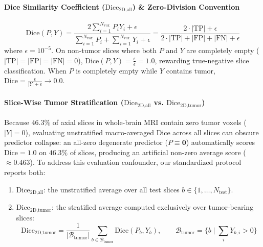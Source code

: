 \documentclass{article}
\begin{document}
\paragraph{Dice Similarity Coefficient ($\text{Dice}_{\text{2D,all}}$) \& Zero-Division Convention}
\begin{equation}
    \text{Dice}(P, Y) = \frac{2 \sum_{i=1}^{N_{\text{vox}}} P_i Y_i + \epsilon}{\sum_{i=1}^{N_{\text{vox}}} P_i + \sum_{i=1}^{N_{\text{vox}}} Y_i + \epsilon} = \frac{2 \cdot |\text{TP}| + \epsilon}{2 \cdot |\text{TP}| + |\text{FP}| + |\text{FN}| + \epsilon}
\end{equation}
where $\epsilon = 10^{-5}$. On non-tumor slices where both $P$ and $Y$ are completely empty ($|\text{TP}| = |\text{FP}| = |\text{FN}| = 0$), $\text{Dice}(P, Y) = \frac{\epsilon}{\epsilon} = 1.0$, rewarding true-negative slice classification. When $P$ is completely empty while $Y$ contains tumor, $\text{Dice} = \frac{\epsilon}{|Y| + \epsilon} \to 0.0$.

\paragraph{Slice-Wise Tumor Stratification ($\text{Dice}_{\text{2D,all}}$ vs. $\text{Dice}_{\text{2D,tumor}}$)}
Because $46.3\%$ of axial slices in whole-brain MRI contain zero tumor voxels ($|Y| = 0$), evaluating unstratified macro-averaged Dice across all slices can obscure predictor collapse: an all-zero degenerate predictor ($P \equiv \mathbf{0}$) automatically scores $\text{Dice} = 1.0$ on $46.3\%$ of slices, producing an artificial non-zero average score ($\approx 0.463$). To address this evaluation confounder, our standardized protocol reports both:
\begin{enumerate}
    \item $\text{Dice}_{\text{2D,all}}$: the unstratified average over all test slices $b \in \{1, \dots, N_{\text{test}}\}$.
    \item $\text{Dice}_{\text{2D,tumor}}$: the stratified average computed exclusively over tumor-bearing slices:
    \begin{equation}
        \text{Dice}_{\text{2D,tumor}} = \frac{1}{|\mathcal{B}_{\text{tumor}}|} \sum_{b \in \mathcal{B}_{\text{tumor}}} \text{Dice}(P_b, Y_b), \qquad \mathcal{B}_{\text{tumor}} = \{b \mid \sum_{i} Y_{b, i} > 0\}
    \end{equation}
\end{enumerate}
\end{document}
